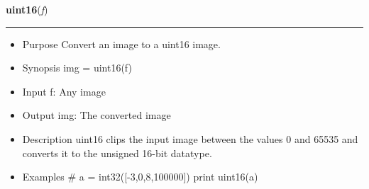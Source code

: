     \begin{boxedminipage}{\textwidth}

    \raggedright \textbf{uint16}(\textit{f})

    \vspace{-1.5ex}

    \rule{\textwidth}{0.5\fboxrule}
    \begin{itemize}
    \setlength{\parskip}{0.6ex}
      \item Purpose Convert an image to a uint16 image.

      \item Synopsis img = uint16(f)

      \item Input f: Any image

      \item Output img: The converted image

      \item Description uint16 clips the input image between the values 0 and 
        65535 and converts it to the unsigned 16-bit datatype.

      \item Examples \# a = int32([-3,0,8,100000]) print uint16(a)

    \end{itemize}

    \vspace{1ex}

    \end{boxedminipage}

    \label{multireg:num_pymorph:uint8}
    \vspace{0.5ex}

